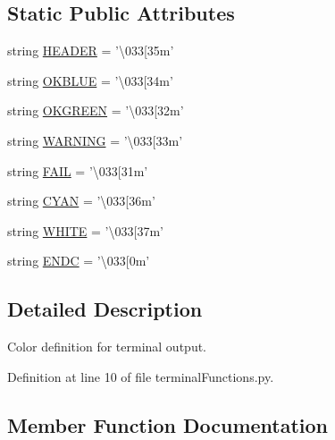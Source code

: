 \subsection*{Static Public Attributes}
\begin{DoxyCompactItemize}
\item 
string \hyperlink{classterminalFunctions_1_1bcolors_a50d541587d89dd99ac431d6ef5eeff5f}{H\-E\-A\-D\-E\-R} = '\textbackslash{}033\mbox{[}35m'
\item 
string \hyperlink{classterminalFunctions_1_1bcolors_ad0dea224533edc2a3447de973bf51896}{O\-K\-B\-L\-U\-E} = '\textbackslash{}033\mbox{[}34m'
\item 
string \hyperlink{classterminalFunctions_1_1bcolors_a4e375485a94ea38094b946fae2636c5d}{O\-K\-G\-R\-E\-E\-N} = '\textbackslash{}033\mbox{[}32m'
\item 
string \hyperlink{classterminalFunctions_1_1bcolors_a36c27269ab26e0af1e7c32ec1bc30806}{W\-A\-R\-N\-I\-N\-G} = '\textbackslash{}033\mbox{[}33m'
\item 
string \hyperlink{classterminalFunctions_1_1bcolors_a47ef6507446b1ae837c650214132a089}{F\-A\-I\-L} = '\textbackslash{}033\mbox{[}31m'
\item 
string \hyperlink{classterminalFunctions_1_1bcolors_a89c304046de2a36a17906a0cdb9ed30c}{C\-Y\-A\-N} = '\textbackslash{}033\mbox{[}36m'
\item 
string \hyperlink{classterminalFunctions_1_1bcolors_a1c93718cb5187b6b7523a334b0650a38}{W\-H\-I\-T\-E} = '\textbackslash{}033\mbox{[}37m'
\item 
string \hyperlink{classterminalFunctions_1_1bcolors_a2dfd48e6d0e3f5bbe44c0103933c1af5}{E\-N\-D\-C} = '\textbackslash{}033\mbox{[}0m'
\end{DoxyCompactItemize}


\subsection{Detailed Description}
Color definition for terminal output. 

Definition at line 10 of file terminal\-Functions.\-py.



\subsection{Member Function Documentation}
